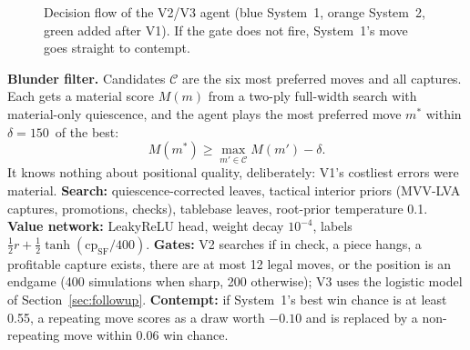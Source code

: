 \begin{figure}[t]
\centering
{}
\caption{Decision flow of the V2/V3 agent (blue System~1, orange System~2, green added after V1). If the gate does not fire, System~1's move goes straight to contempt.}
\label{fig:arch2}
\end{figure}

\textbf{Blunder filter.} Candidates $\mathcal C$ are the six most preferred moves and all captures. Each gets a material score $M(m)$ from a two-ply full-width search with material-only quiescence, and the agent plays the most preferred move $m^{\ast}$ within $\delta=150$\cp\ of the best:
\begin{equation}
M(m^{\ast})\ge \max_{m'\in\mathcal C} M(m')-\delta .
\end{equation}
It knows nothing about positional quality, deliberately: V1's costliest errors were material. \textbf{Search:} quiescence-corrected leaves, tactical interior priors (MVV-LVA captures, promotions, checks), tablebase leaves, root-prior temperature 0.1. \textbf{Value network:} LeakyReLU head, weight decay $10^{-4}$, labels $\tfrac12 r+\tfrac12\tanh(\mathrm{cp}_{\mathrm{SF}}/400)$. \textbf{Gates:} V2 searches if in check, a piece hangs, a profitable capture exists, there are at most 12 legal moves, or the position is an endgame (400 simulations when sharp, 200 otherwise); V3 uses the logistic model of Section~\ref{sec:followup}. \textbf{Contempt:} if System~1's best win chance is at least 0.55, a repeating move scores as a draw worth $-0.10$ and is replaced by a non-repeating move within 0.06 win chance.
